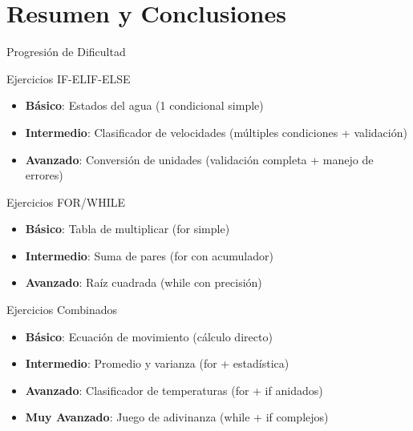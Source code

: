 \documentclass[10pt]{beamer}
\begin{document}
\section{Resumen y Conclusiones}

\begin{frame}{Progresión de Dificultad}
  \begin{block}{Ejercicios IF-ELIF-ELSE}
    \begin{itemize}
      \item \textbf{Básico}: Estados del agua (1 condicional simple)
      \item \textbf{Intermedio}: Clasificador de velocidades (múltiples condiciones + validación)
      \item \textbf{Avanzado}: Conversión de unidades (validación completa + manejo de errores)
    \end{itemize}
  \end{block}
  
  \begin{block}{Ejercicios FOR/WHILE}
    \begin{itemize}
      \item \textbf{Básico}: Tabla de multiplicar (for simple)
      \item \textbf{Intermedio}: Suma de pares (for con acumulador)
      \item \textbf{Avanzado}: Raíz cuadrada (while con precisión)
    \end{itemize}
  \end{block}
  
  \begin{block}{Ejercicios Combinados}
    \begin{itemize}
      \item \textbf{Básico}: Ecuación de movimiento (cálculo directo)
      \item \textbf{Intermedio}: Promedio y varianza (for + estadística)
      \item \textbf{Avanzado}: Clasificador de temperaturas (for + if anidados)
      \item \textbf{Muy Avanzado}: Juego de adivinanza (while + if complejos)
    \end{itemize}
  \end{block}
\end{frame}
\end{document}

